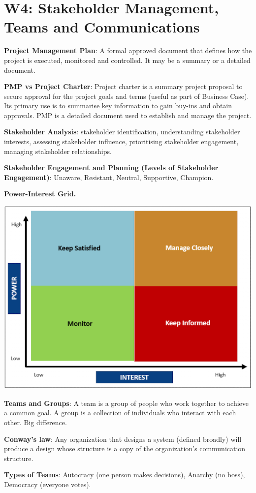 \section{W4: Stakeholder Management, Teams and Communications}

\textbf{Project Management Plan}: A formal approved document that defines how the project is executed, monitored and controlled. It may be a summary or a detailed document.

\textbf{PMP vs Project Charter}: Project charter is a summary project proposal to secure approval for the project goals and terms (useful as part of Business Case). Its primary use is to summarise key information to gain buy-ins and obtain approvals. PMP is a detailed document used to establish and manage the project.

\textbf{Stakeholder Analysis}: stakeholder identification, understanding stakeholder interests, assessing stakeholder influence, prioritising stakeholder engagement, managing stakeholder relationships.

\textbf{Stakeholder Engagement and Planning (Levels of Stakeholder Engagement)}: Unaware, Resistant, Neutral, Supportive, Champion.

\textbf{Power-Interest Grid.}

    \includegraphics[width=\linewidth]{figs/SCR-20240606-jlgn.png}

\textbf{Teams and Groups}: A team is a group of people who work together to achieve a common goal. A group is a collection of individuals who interact with each other. Big difference. 

\textbf{Conway's law}: Any organization that designs a system (defined broadly) will produce a design whose structure is a copy of the organization's communication structure.

\textbf{Types of Teams}: Autocracy (one person makes decisions), Anarchy (no boss), Democracy (everyone votes).
